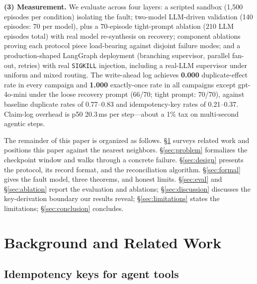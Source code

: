 \documentclass[10pt,journal,compsoc]{IEEEtran}
\begin{document}
\textbf{(3) Measurement.} We evaluate across four layers: a
scripted sandbox (1,500 episodes per condition) isolating the
fault; two-model LLM-driven validation (140 episodes: 70 per model),
plus a 70-episode tight-prompt ablation (210 LLM episodes total) with real
model re-synthesis on recovery; component ablations proving each
protocol piece load-bearing against disjoint failure modes; and a
production-shaped LangGraph deployment (branching supervisor,
parallel fan-out, retries) with real \texttt{SIGKILL} injection,
including a real-LLM supervisor under uniform and mixed routing.
The write-ahead log achieves \textbf{0.000} duplicate-effect rate in
every campaign and \textbf{1.000} exactly-once rate in all campaigns
except gpt-4o-mini under the loose recovery prompt (66/70; tight
prompt: 70/70), against baseline duplicate rates of 0.77--0.83 and
idempotency-key rates of 0.21--0.37. Claim-log overhead is p50
20.3\,ms per step---about a 1\% tax on multi-second agentic steps.

The remainder of this paper is organized as follows.
\S\ref{sec:related} surveys related work and positions this paper
against the nearest neighbors. \S\ref{sec:problem} formalizes the
checkpoint window and walks through a concrete failure.
\S\ref{sec:design} presents the protocol, its record format, and
the reconciliation algorithm. \S\ref{sec:formal} gives the fault
model, three theorems, and honest limits. \S\ref{sec:eval} and
\S\ref{sec:ablation} report the evaluation and ablations;
\S\ref{sec:discussion} discusses the key-derivation boundary our
results reveal; \S\ref{sec:limitations} states the limitations;
\S\ref{sec:conclusion} concludes.

\section{Background and Related Work}
\label{sec:related}

\subsection{Idempotency keys for agent tools}
\end{document}
